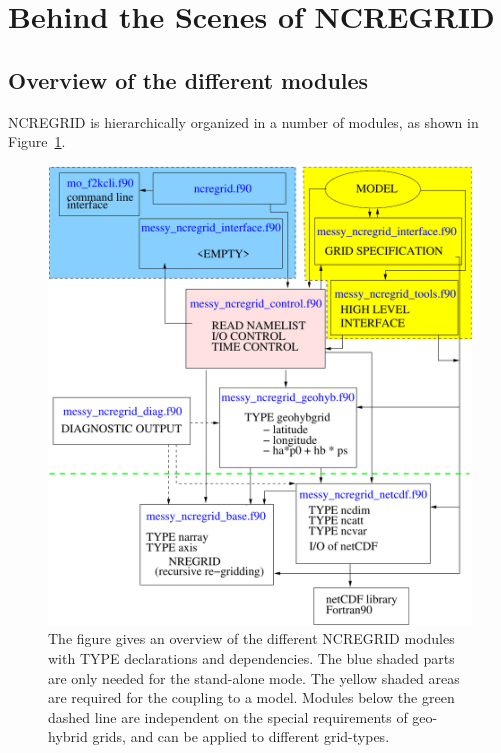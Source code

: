 \documentclass[12pt, a4paper]{article}
\begin{document}

\section{Behind the Scenes of NCREGRID}
%
\subsection{Overview of the different modules}
NCREGRID is hierarchically organized in a number of modules, as shown in
Figure~\ref{fig:overview}.
%
\begin{figure}
  \centerline{\includegraphics[width=14cm]{overview}}
  \caption[Overview of the different NCREGRID modules]
          {The figure gives an overview of the different NCREGRID modules
           with TYPE declarations and dependencies. The blue shaded parts are
           only needed for the stand-alone mode. The yellow shaded
           areas are required for the coupling to a model.
           Modules below the green dashed line are independent
           on the special requirements of geo-hybrid grids, and can
           be applied to different grid-types.}
  \label{fig:overview}
\end{figure}
%
\end{document}
